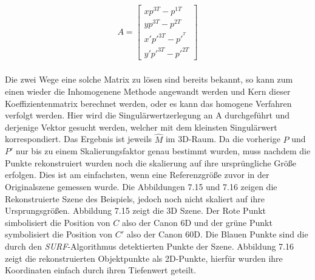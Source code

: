 \begin{gather}
A = \begin{bmatrix}
xp^{3T}-p^{1T}\\
yp^{3T}-p^{2T}\\
x'p'^{3T}-p'^{^T}\\
y'p'^{3T}-p'^{2T}
\end{bmatrix}
\end{gather}\\

Die zwei Wege eine solche Matrix zu lösen sind bereits bekannt, so kann zum einen wieder die Inhomogenene Methode angewandt werden und Kern dieser Koeffizientenmatrix berechnet werden, oder es kann das homogene Verfahren verfolgt werden. Hier wird die Singulärwertzerlegung an A durchgeführt und derjenige Vektor gesucht werden, welcher mit dem kleinsten Singulärwert korrespondiert\cite{HZ}. Das Ergebnis ist jeweils $\hat{M}$ im 3D-Raum. Da die vorherige $P$ und $P'$ nur bis zu einem Skalierungsfaktor genau bestimmt wurden, muss nachdem die Punkte rekonstruiert wurden noch die skalierung auf ihre ursprüngliche Größe erfolgen. Dies ist am einfachsten, wenn eine Referenzgröße zuvor in der Originalszene gemessen wurde. Die Abbildungen 7.15 und 7.16 zeigen die Rekonstruierte Szene des Beispiels, jedoch noch nicht skaliert auf ihre Ursprungsgrößen. Abbildung 7.15 zeigt die 3D Szene. Der Rote Punkt simbolisiert die Position von $C$ also der Canon 6D und der grüne Punkt symbolisiert die Position von $C'$ also der Canon 60D. Die Blauen Punkte sind die durch den \textit{SURF}-Algorithmus detektierten Punkte der Szene. Abbildung 7.16 zeigt die rekonstruierten Objektpunkte als 2D-Punkte, hierfür wurden ihre Koordinaten einfach durch ihren Tiefenwert geteilt. 


